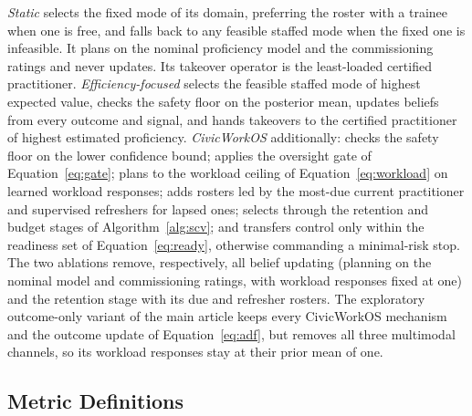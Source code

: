 \documentclass[utf8]{frontiers_suppmat}
\begin{document}
\textit{Static} selects the fixed mode of its domain, preferring the roster with a trainee when one is free, and falls back to any feasible staffed mode when the fixed one is infeasible. It plans on the nominal proficiency model and the commissioning ratings and never updates. Its takeover operator is the least-loaded certified practitioner. \textit{Efficiency-focused} selects the feasible staffed mode of highest expected value, checks the safety floor on the posterior mean, updates beliefs from every outcome and signal, and hands takeovers to the certified practitioner of highest estimated proficiency. \textit{CivicWorkOS} additionally: checks the safety floor on the lower confidence bound; applies the oversight gate of Equation~\eqref{eq:gate}; plans to the workload ceiling of Equation~\eqref{eq:workload} on learned workload responses; adds rosters led by the most-due current practitioner and supervised refreshers for lapsed ones; selects through the retention and budget stages of Algorithm~\ref{alg:scv}; and transfers control only within the readiness set of Equation~\eqref{eq:ready}, otherwise commanding a minimal-risk stop. The two ablations remove, respectively, all belief updating (planning on the nominal model and commissioning ratings, with workload responses fixed at one) and the retention stage with its due and refresher rosters. The exploratory outcome-only variant of the main article keeps every CivicWorkOS mechanism and the outcome update of Equation~\eqref{eq:adf}, but removes all three multimodal channels, so its workload responses stay at their prior mean of one.

\subsection{Metric Definitions}
\label{app:protocol-metrics}
\end{document}
